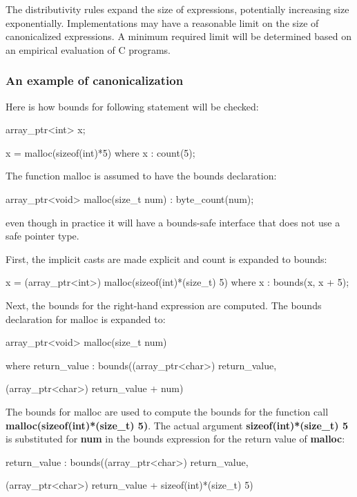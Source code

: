 \documentclass[]{article}
\begin{document}
The distributivity rules expand the size of expressions, potentially
increasing size exponentially. Implementations may have a reasonable
limit on the size of canonicalized expressions. A minimum required limit
will be determined based on an empirical evaluation of C programs.

\subsubsection{\texorpdfstring{\protect\hypertarget{ux5fToc440445468}{}{\protect\hypertarget{ux5fToc440449250}{}{\protect\hypertarget{ux5fToc440551900}{}{}}}An
example of
canonicalization}{An example of canonicalization}}\label{an-example-of-canonicalization}

Here is how bounds for following statement will be checked:

array\_ptr\textless{}int\textgreater{} x;

x = malloc(sizeof(int)*5) where x : count(5);

The function malloc is assumed to have the bounds declaration:

array\_ptr\textless{}void\textgreater{} malloc(size\_t num) :
byte\_count(num);

even though in practice it will have a bounds-safe interface that does
not use a safe pointer type.

First, the implicit casts are made explicit and count is expanded to
bounds:

x = (array\_ptr\textless{}int\textgreater{})
malloc(sizeof(int)*(size\_t) 5) where x : bounds(x, x + 5);

Next, the bounds for the right-hand expression are computed. The bounds
declaration for malloc is expanded to:

array\_ptr\textless{}void\textgreater{} malloc(size\_t num)

where return\_value : bounds((array\_ptr\textless{}char\textgreater{})
return\_value,

(array\_ptr\textless{}char\textgreater{}) return\_value + num)

The bounds for malloc are used to compute the bounds for the function
call \textbf{malloc(sizeof(int)*(size\_t) 5)}. The actual argument
\textbf{sizeof(int)*(size\_t) 5} is substituted for \textbf{num} in the
bounds expression for the return value of \textbf{malloc}:

return\_value : bounds((array\_ptr\textless{}char\textgreater{})
return\_value,

(array\_ptr\textless{}char\textgreater{}) return\_value +
sizeof(int)*(size\_t) 5)
\end{document}
